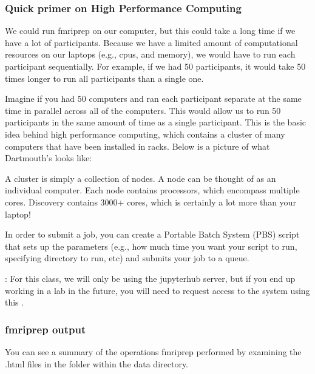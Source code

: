 \documentclass[letterpaper,10pt,english]{sphinxmanual}
\begin{document}
\subsubsection{Quick primer on High Performance Computing}
\label{\detokenize{content/Preprocessing:quick-primer-on-high-performance-computing}}
We could run fmriprep on our computer, but this could take a long time if we have a lot of participants. Because we have a limited amount of computational resources on our laptops (e.g., cpus, and memory), we would have to run each participant sequentially. For example, if we had 50 participants, it would take 50 times longer to run all participants than a single one.

Imagine if you had 50 computers and ran each participant separate at the same time in parallel across all of the computers. This would allow us to run 50 participants in the same amount of time as a single participant. This is the basic idea behind high performance computing, which contains a cluster of many computers that have been installed in racks. Below is a picture of what Dartmouth’s  looks like:


A cluster is simply a collection of nodes. A node can be thought of as an individual computer. Each node contains processors, which encompass multiple cores. Discovery contains 3000+ cores, which is certainly a lot more than your laptop!

In order to submit a job, you can create a Portable Batch System (PBS) script that sets up the parameters (e.g., how much time you want your script to run, specifying directory to run, etc) and submits your job to a queue.

: For this class, we will only be using the jupyterhub server, but if you end up working in a lab in the future, you will need to request access to the  system using this .


\subsubsection{fmriprep output}
\label{\detokenize{content/Preprocessing:fmriprep-output}}
You can see a summary of the operations fmriprep performed by examining the .html files in the  folder within the  data directory.
\end{document}
